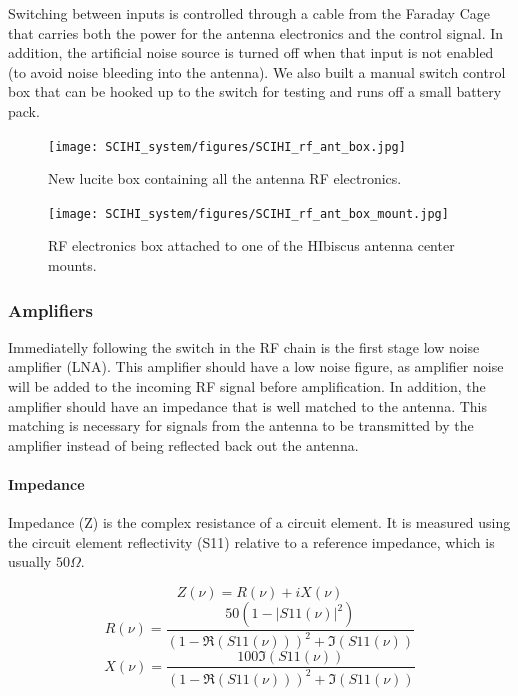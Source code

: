 Switching between inputs is controlled through a cable from the Faraday Cage that carries both the power for the antenna electronics and the control signal. In addition, the artificial noise source is turned off when that input is not enabled (to avoid noise bleeding into the antenna). We also built a manual switch control box that can be hooked up to the switch for testing and runs off a small battery pack. 

\begin{figure}[htb]
\centering
\begin{minipage}[b]{0.47\textwidth}
\centering
\texttt{[image: SCIHI\_system/figures/SCIHI\_rf\_ant\_box.jpg]}
\caption{New lucite box containing all the antenna RF electronics.}
\label{Fig:rf_ant_box}
\end{minipage}%
\begin{minipage}[b]{0.02\textwidth}
\hspace{1cm}
\end{minipage}%
\begin{minipage}[b]{0.47\textwidth}
\centering
\texttt{[image: SCIHI\_system/figures/SCIHI\_rf\_ant\_box\_mount.jpg]}
\caption{RF electronics box attached to one of the HIbiscus antenna center mounts.}
\label{Fig:rf_ant_mount}
\end{minipage}
\end{figure}

\subsubsection{Amplifiers} \label{Sec:Amp}
Immediatelly following the switch in the RF chain is the first stage low noise amplifier (LNA). This amplifier should have a low noise figure, as amplifier noise will be added to the incoming RF signal before amplification. In addition, the amplifier should have an impedance that is well matched to the antenna. This matching is necessary for signals from the antenna to be transmitted by the amplifier instead of being reflected back out the antenna. 

\paragraph{Impedance} 
Impedance (Z) is the complex resistance of a circuit element. It is measured using the circuit element reflectivity (S11) relative to a reference impedance, which is usually $50 \Omega$. \cite{stutzman1981}

\begin{equation}\label{Eq:Imp_calc}
Z(\nu) = R(\nu)+ i X(\nu) 
\end{equation}
\begin{equation}
R(\nu) = \frac{50 (1-|S11(\nu)|^2)}{(1-\Re(S11(\nu)))^2 + \Im(S11(\nu))} 
\end{equation}
\begin{equation}
X(\nu) = \frac{100 \Im(S11(\nu))}{(1-\Re(S11(\nu)))^2 + \Im(S11(\nu))} 
\end{equation}

